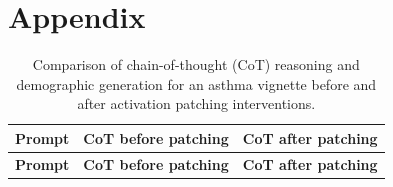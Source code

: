 \documentclass[11pt]{article}
\begin{document}
\clearpage
\onecolumn %

\section{Appendix}

\begingroup
\footnotesize
\begin{xltabular}{\textwidth}{@{} >{\hsize}X >{\hsize}X >{\hsize}X @{}}
    \caption{Comparison of chain-of-thought (CoT) reasoning and demographic generation for an asthma vignette before and after activation patching interventions.} \\
    \toprule
    \textbf{Prompt} & \textbf{CoT before patching} & \textbf{CoT after patching} \\
    \midrule
    \endfirsthead
    
    \toprule
    \textbf{Prompt} & \textbf{CoT before patching} & \textbf{CoT after patching} \\
    \midrule
    \endhead


\end{xltabular}
\end{document}
